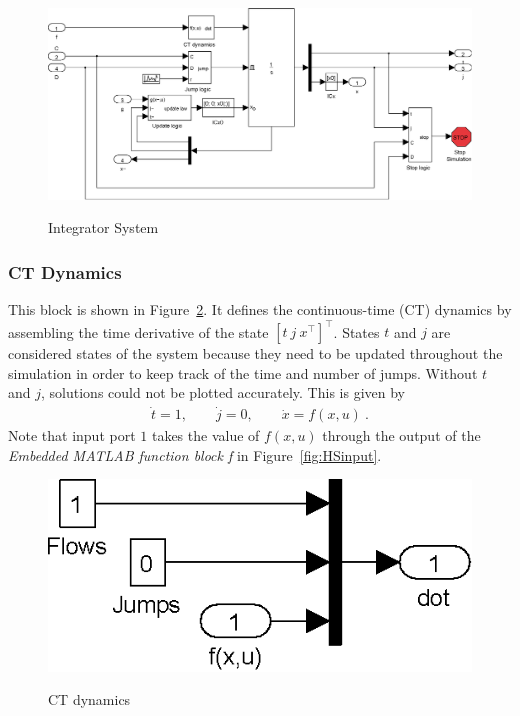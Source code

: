 \documentclass{article}
\begin{document}
\begin{figure}[ht]
  \begin{center}
    {\includegraphics[width=.95\textwidth]{figures/Simulink/Integrator.eps}}
   \caption{Integrator System}
\label{fig:integratorsystem}
  \end{center}
\end{figure}


\subsubsection{CT Dynamics}

This block is shown in Figure~\ref{fig:CTdynamics}. It defines the continuous-time (CT) dynamics by assembling the time derivative of the state $[t\ j\ x^\top]^\top$. States $t$ and $j$ are considered states of the system because they need to be updated throughout the simulation in order to keep track of the time and number of jumps. Without $t$ and $j$, solutions could not be plotted accurately.
This is given by
\begin{eqnarray*}
\dot{t} = 1, \qquad \dot{j} = 0, \qquad \dot{x} = f(x,u)\ .
\end{eqnarray*}
Note that input port $1$ takes the value of $f(x,u)$ through the output of the
{\em Embedded MATLAB function block f} in Figure~\ref{fig:HSinput}.

\begin{figure}[ht]
  \begin{center}
    {\includegraphics[width=.4\textwidth]{figures/Simulink/CTdynamics.eps}}
   \caption{CT dynamics}
\label{fig:CTdynamics}
 \end{center}
\end{figure}
\end{document}
